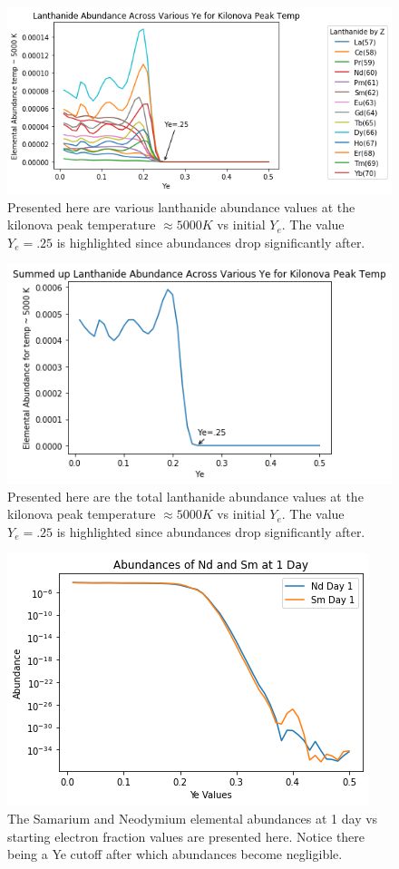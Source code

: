 \documentclass[11pt,a4paper]{article}
\begin{document}
\begin{figure}[h!]
  \includegraphics[scale = .6]{abun_vs_ye_temp.png}
  \centering
  \caption{Presented here are various lanthanide abundance values at the kilonova peak temperature  $\approx 5000K$ vs initial $Y_e$. The value $Y_e = .25$ is highlighted since abundances drop significantly after.}
\end{figure} 


\begin{figure}[h!]
  \includegraphics[scale = .6]{summed.png}
  \centering
  \caption{Presented here are the total lanthanide abundance values at the kilonova peak temperature $\approx 5000K$ vs initial $Y_e$. The value $Y_e = .25$ is highlighted since abundances drop significantly after.}
\end{figure} 


\begin{figure}[h!]
  \includegraphics[scale = .75]{sm_nd_day1.png}
  \centering
  \caption{The Samarium and Neodymium elemental abundances at 1 day vs starting electron fraction values are presented here. Notice there being a Ye cutoff after which abundances become negligible.}
\end{figure} 
\end{document}
